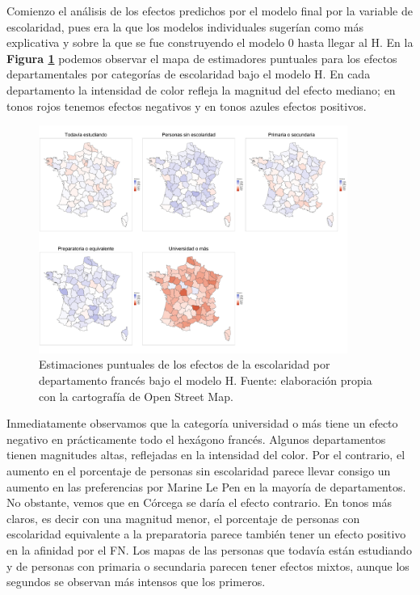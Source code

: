 Comienzo el análisis de los efectos predichos por el modelo final por la variable de escolaridad, pues era la que los modelos individuales sugerían como más explicativa y sobre la que se fue construyendo el modelo 0 hasta llegar al H. En la \textbf{Figura \ref{fig:Mapa_Efectos_Escolaridad}} podemos observar el mapa de estimadores puntuales para los efectos departamentales por categorías de escolaridad bajo el modelo H. En cada departamento la intensidad de color refleja la magnitud del efecto mediano; en tonos rojos tenemos efectos negativos y en tonos azules efectos positivos.\\

\begin{figure}
	\centering
	\includegraphics[width = 0.9\textwidth]{Figs/Efectos/Mapa_Efectos_Escolaridad_Modelo_H}
	\caption{Estimaciones puntuales de los efectos de la escolaridad por departamento francés bajo el modelo H. Fuente: elaboración propia con la cartografía de Open Street Map.}
	\label{fig:Mapa_Efectos_Escolaridad}
\end{figure}

Inmediatamente observamos que la categoría universidad o más tiene un efecto negativo en prácticamente todo el hexágono francés. Algunos departamentos tienen magnitudes altas, reflejadas en la intensidad del color. Por el contrario, el aumento en el porcentaje de personas sin escolaridad parece llevar consigo un aumento en las preferencias por Marine Le Pen en la mayoría de departamentos. No obstante, vemos que en Córcega se daría el efecto contrario. En tonos más claros, es decir con una magnitud menor, el porcentaje de personas con escolaridad equivalente a la preparatoria parece también tener un efecto positivo en la afinidad por el FN. Los mapas de las personas que todavía están estudiando y de personas con primaria o secundaria parecen tener efectos mixtos, aunque los segundos se observan más intensos que los primeros.\\

